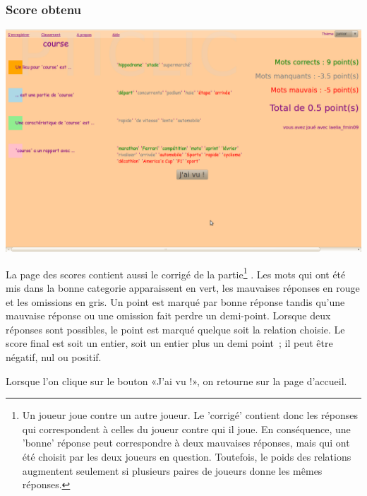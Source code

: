 \documentclass[a4paper,11pt,french]{article}
\begin{document}
\subsubsection{Score obtenu}
\begin{center}
\includegraphics[width=14cm]{img/PtiClicResultats.png}
\end{center}

La page des scores contient aussi le corrigé de la partie\footnote{Un joueur joue contre un autre joueur. Le 'corrigé' contient donc les réponses qui correspondent à celles du joueur contre qui il joue. En conséquence, une 'bonne' réponse peut correspondre à deux mauvaises réponses, mais qui ont été choisit par les deux joueurs en question. Toutefois, le poids des relations augmentent seulement si plusieurs paires de joueurs donne les mêmes réponses.} . Les mots qui ont été mis dans la bonne categorie apparaissent en vert, les
mauvaises réponses en rouge et les omissions en gris. Un point est marqué par bonne réponse tandis qu'une mauvaise réponse ou une omission
fait perdre un demi-point. Lorsque deux réponses sont possibles, le point est marqué quelque soit la relation choisie. Le score final est
soit un entier, soit un entier plus un demi point~; il peut être négatif, nul ou positif.

Lorsque l'on clique sur le bouton «J'ai vu !», on retourne sur la page d'accueil.
\end{document}
